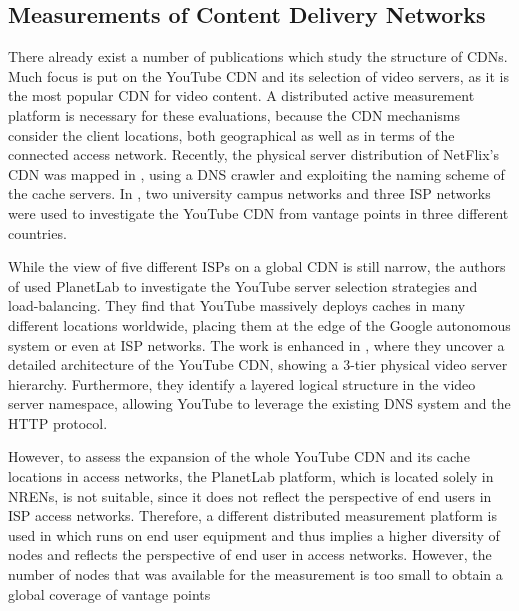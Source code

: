 \subsection{Measurements of Content Delivery Networks}\label{aslevel:measurements:cdn}
There already exist a number of publications which study the structure of CDNs.
Much focus is put on the YouTube CDN and its selection of video servers, as it is the most popular CDN for video content.
A distributed active measurement platform is necessary for these evaluations, because the CDN mechanisms consider the client locations, both geographical as well as in terms of the connected access network.
Recently, the physical server distribution of NetFlix's CDN was mapped in \cite{bottger2016open}, using a DNS crawler and exploiting the naming scheme of the cache servers.
In \cite{torres2011dissecting}, two university campus networks and three ISP networks were used to investigate the YouTube CDN from vantage points in three different countries.

While the view of five different ISPs on a global CDN is still narrow, the authors of \cite{adhikari2011you} used PlanetLab to investigate the YouTube server selection strategies and load-balancing.
They find that YouTube massively deploys caches in many different locations worldwide, placing them at the edge of the Google autonomous system or even at ISP networks.
The work is enhanced in \cite{adhikari2012vivisecting}, where they uncover a detailed architecture of the YouTube CDN, showing a 3-tier physical video server hierarchy.
Furthermore, they identify a layered logical structure in the video server namespace, allowing YouTube to leverage the existing DNS system and the HTTP protocol.

However, to assess the expansion of the whole YouTube CDN and its cache locations in access networks, the PlanetLab platform, which is located solely in NRENs, is not suitable, since it does not reflect the perspective of end users in ISP access networks.
Therefore, a different distributed measurement platform is used in \cite{rafetseder2011exploring} which runs on end user equipment and thus implies a higher diversity of nodes and reflects the perspective of end user in access networks.
However, the number of nodes that was available for the measurement is too small to obtain a global coverage of vantage points

